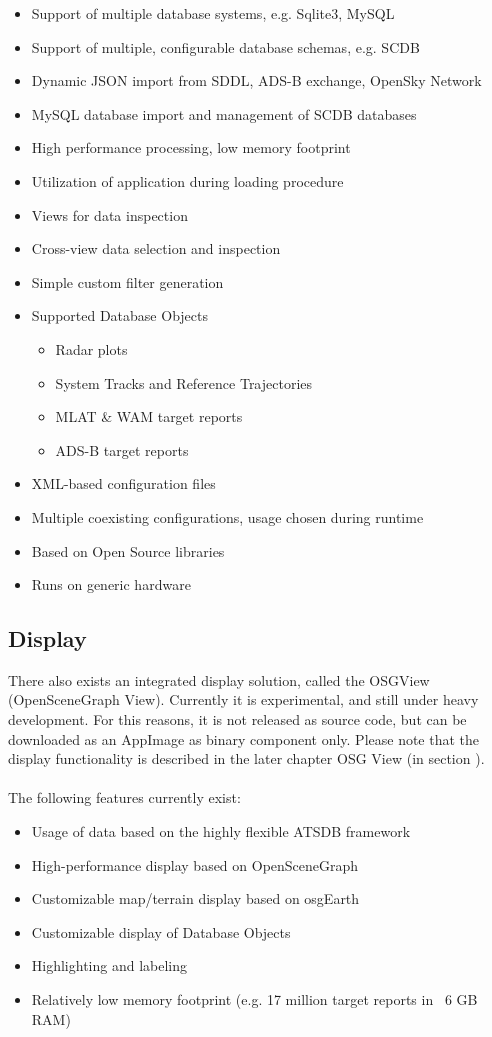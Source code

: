 \begin{itemize}  
\item Support of multiple database systems, e.g. Sqlite3, MySQL
\item Support of multiple, configurable database schemas, e.g. SCDB
\item Dynamic JSON import from SDDL, ADS-B exchange, OpenSky Network
\item MySQL database import and management of SCDB databases
\item High performance processing, low memory footprint
\item Utilization of application during loading procedure
\item Views for data inspection
\item Cross-view data selection and inspection
\item Simple custom filter generation
\item Supported Database Objects
\begin{itemize}  
\item Radar plots
\item System Tracks and Reference Trajectories
\item MLAT \& WAM target reports
\item ADS-B target reports
\end{itemize}
\item XML-based configuration files
\item Multiple coexisting configurations, usage chosen during runtime
\item Based on Open Source libraries
\item Runs on generic hardware
\end{itemize}

\subsection{Display}
There also exists an integrated display solution, called the OSGView (OpenSceneGraph View). Currently it is experimental, and still under heavy development. For this reasons, it is not released as source code, but can be downloaded as an AppImage as binary component only. Please note that the display functionality is described in the later chapter OSG View (in section ).\\\\

The following features currently exist:

\begin{itemize}  
\item Usage of data based on the highly flexible ATSDB framework
\item High-performance display based on OpenSceneGraph
\item Customizable map/terrain display based on osgEarth
\item Customizable display of Database Objects
\item Highlighting and labeling
\item Relatively low memory footprint (e.g. 17 million target reports in ~6 GB RAM)
\end{itemize}

